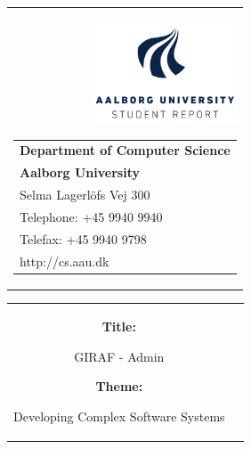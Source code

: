 \thispagestyle{empty}
\begin{titlepage}
	\setcounter{page}{3}
\begin{nopagebreak}
{\samepage 
\begin{tabular}{r}
\parbox{\textwidth}{  \raisebox{-14mm} {\includegraphics[height=3.0cm]{images/aau-stud-logo.pdf}}
\hfill \parbox{4.9cm}{\begin{tabular}{l}
{\sf\small \textbf{Department of Computer Science}}\\
{\sf\small  \textbf{Aalborg University}} \\
{\sf\small Selma Lagerl\"{o}fs Vej 300} \\
{\sf\small Telephone: +45 9940 9940} \\
{\sf\small Telefax:   +45 9940 9798} \\
{\sf\small http://cs.aau.dk}
\end{tabular}}}
\\
\end{tabular}
\vspace{-12pt}
\begin{tabular}{cc}
\parbox{7cm}{
\begin{description}

\item {\bf Title:} 

GIRAF - Admin

\item {\bf Theme:} 

Developing Complex Software Systems

\end{description}

\parbox{8cm}{

}}
\end{tabular}}
\end{nopagebreak}
\end{titlepage}

